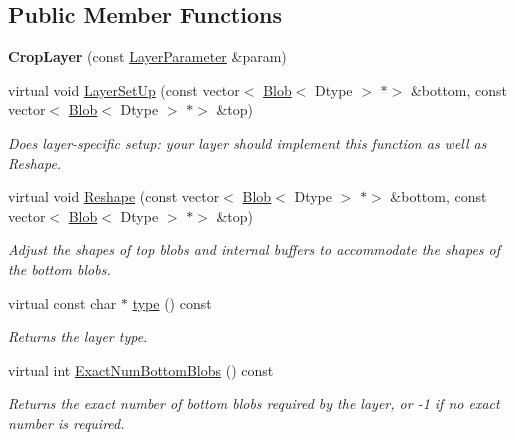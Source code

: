 \subsection*{Public Member Functions}
\begin{DoxyCompactItemize}
\item 
\mbox{\label{classcaffe_1_1_crop_layer_a4baa861ad4fc049250b41111cb9588c2}} 
{\bfseries Crop\+Layer} (const \mbox{\hyperlink{classcaffe_1_1_layer_parameter}{Layer\+Parameter}} \&param)
\item 
virtual void \mbox{\hyperlink{classcaffe_1_1_crop_layer_a59dcb04b78d55f666b69ff001c90caa7}{Layer\+Set\+Up}} (const vector$<$ \mbox{\hyperlink{classcaffe_1_1_blob}{Blob}}$<$ Dtype $>$ $\ast$$>$ \&bottom, const vector$<$ \mbox{\hyperlink{classcaffe_1_1_blob}{Blob}}$<$ Dtype $>$ $\ast$$>$ \&top)
\begin{DoxyCompactList}\small\item\em Does layer-\/specific setup\+: your layer should implement this function as well as Reshape. \end{DoxyCompactList}\item 
virtual void \mbox{\hyperlink{classcaffe_1_1_crop_layer_a195d2e437a70b0139411c1dd22b08120}{Reshape}} (const vector$<$ \mbox{\hyperlink{classcaffe_1_1_blob}{Blob}}$<$ Dtype $>$ $\ast$$>$ \&bottom, const vector$<$ \mbox{\hyperlink{classcaffe_1_1_blob}{Blob}}$<$ Dtype $>$ $\ast$$>$ \&top)
\begin{DoxyCompactList}\small\item\em Adjust the shapes of top blobs and internal buffers to accommodate the shapes of the bottom blobs. \end{DoxyCompactList}\item 
\mbox{\label{classcaffe_1_1_crop_layer_af2261efb4a0861a1db4f8620fe4914de}} 
virtual const char $\ast$ \mbox{\hyperlink{classcaffe_1_1_crop_layer_af2261efb4a0861a1db4f8620fe4914de}{type}} () const
\begin{DoxyCompactList}\small\item\em Returns the layer type. \end{DoxyCompactList}\item 
virtual int \mbox{\hyperlink{classcaffe_1_1_crop_layer_ac6386917437ef54003bb7f8c2618f5fe}{Exact\+Num\+Bottom\+Blobs}} () const
\begin{DoxyCompactList}\small\item\em Returns the exact number of bottom blobs required by the layer, or -\/1 if no exact number is required. \end{DoxyCompactList}\item 

\end{DoxyCompactItemize}
